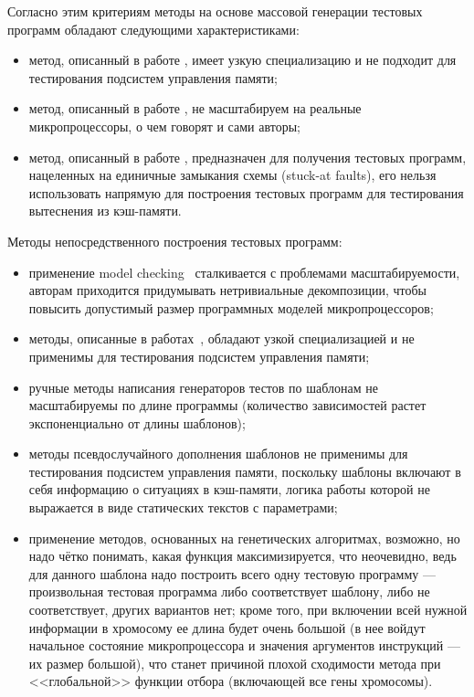 Согласно этим критериям методы на основе массовой генерации тестовых программ обладают следующими характеристиками:
\begin{itemize}
	\item метод, описанный в работе \cite{Berkeley89}, имеет узкую специализацию и не подходит для тестирования подсистем управления памяти;
	\item метод, описанный в работе \cite{MishraDutt02}, не масштабируем на реальные микропроцессоры, о чем говорят и сами авторы;
	\item метод, описанный в работе \cite{microGP}, предназначен для получения тестовых программ, нацеленных на единичные замыкания схемы (stuck-at faults), его нельзя использовать напрямую для построения тестовых программ для тестирования вытеснения из кэш-памяти.
\end{itemize}

Методы непосредственного построения тестовых программ:
\begin{itemize}
		\item применение model checking~\cite{MishraDutt04} сталкивается с проблемами масштабируемости, авторам приходится придумывать нетривиальные декомпозиции, чтобы повысить допустимый размер программных моделей микропроцессоров;
		\item методы, описанные в работах~\cite{MishraDutt05, Branches99}, обладают узкой специализацией и не применимы для тестирования подсистем управления памяти;
		\item ручные методы написания генераторов тестов по шаблонам не масштабируемы по длине программы (количество зависимостей растет экспоненциально от длины шаблонов);
		\item методы псевдослучайного дополнения шаблонов не применимы для тестирования подсистем управления памяти, поскольку шаблоны включают в себя информацию о ситуациях в кэш-памяти, логика работы которой  не выражается в виде статических текстов с параметрами;
		\item применение методов, основанных на генетических алгоритмах, возможно, но надо чётко понимать, какая функция максимизируется, что неочевидно, ведь для данного шаблона надо построить всего одну тестовую программу --- произвольная тестовая программа либо соответствует шаблону, либо не соответствует, других вариантов нет; кроме того, при включении всей нужной информации в хромосому ее длина будет очень большой (в нее войдут начальное состояние микропроцессора и значения аргументов  инструкций --- их размер большой), что станет причиной плохой сходимости метода при <<глобальной>> функции отбора (включающей все гены хромосомы).
\end{itemize}


